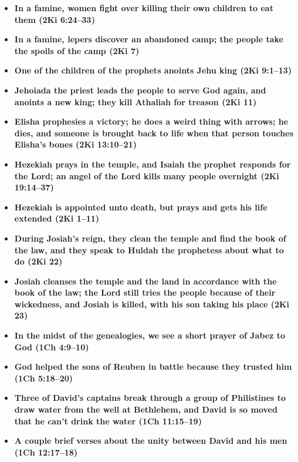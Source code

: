 \begin{itemize}
\item \textbf{In a famine, women fight over killing their own children to eat them (2Ki 6:24--33)} 

\item \textbf{In a famine, lepers discover an abandoned camp; the people take the spoils of the camp (2Ki 7)} 

\item \textbf{One of the children of the prophets anoints Jehu king (2Ki 9:1--13)} 

\item \textbf{Jehoiada the priest leads the people to serve God again, and anoints a new king; they kill Athaliah for treason (2Ki 11)} 

\item \textbf{Elisha prophesies a victory; he does a weird thing with arrows; he dies, and someone is brought back to life when that person touches Elisha's bones (2Ki 13:10--21)}

\item \textbf{Hezekiah prays in the temple, and Isaiah the prophet responds for the Lord; an angel of the Lord kills many people overnight (2Ki 19:14--37)}

\item \textbf{Hezekiah is appointed unto death, but prays and gets his life extended (2Ki 1--11)}

\item \textbf{During Josiah's reign, they clean the temple and find the book of the law, and they speak to Huldah the prophetess about what to do (2Ki 22)}

\item \textbf{Josiah cleanses the temple and the land in accordance with the book of the law; the Lord still tries the people because of their wickedness, and Josiah is killed, with his son taking his place (2Ki 23)}

\item \textbf{In the midst of the genealogies, we see a short prayer of Jabez to God (1Ch 4:9--10)}

\item \textbf{God helped the sons of Reuben in battle because they trusted him (1Ch 5:18--20)} 

\item \textbf{Three of David's captains break through a group of Philistines to draw water from the well at Bethlehem, and David is so moved that he can't drink the water (1Ch 11:15--19)}

\item \textbf{A couple brief verses about the unity between David and his men (1Ch 12:17--18)}


\end{itemize}
